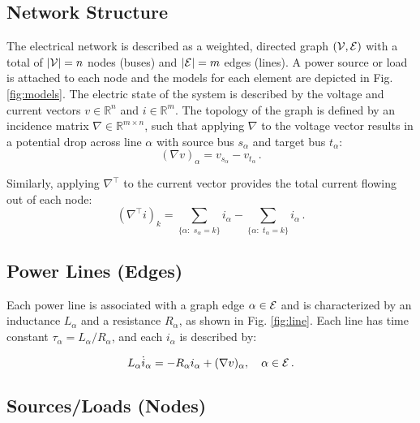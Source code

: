 \documentclass[letterpaper, 10 pt, conference]{ieeeconf}
\begin{document}
\subsection{Network Structure}

The electrical network is described as a weighted, directed graph $({\cal V,\cal E})$ with a total of  $|{\cal V}| = n$ nodes (buses) and $|{\cal E}| = m$ edges (lines). A power source or load is attached to each node and the models for each element are depicted in Fig. \ref{fig:models}. The electric state of the system is described by the voltage and current vectors $v \in \mathbb{R}^n$ and $i \in \mathbb{R}^m$. The topology of the graph is defined by an incidence matrix $\nabla \in \mathbb{R}^{m\times n}$, such that applying $\nabla$ to the voltage vector results in a potential drop across line $\alpha$ with source bus $s_\alpha$ and target bus $t_{\alpha}$:
\begin{equation}\label{Eq:vdrop}
    (\nabla v)_\alpha = v_{s_\alpha} - v_{t_\alpha}\,.
\end{equation}

\noindent Similarly, applying $\nabla^\top$ to the current vector provides the total current flowing out of each node:
\begin{equation}\label{Eq:isum}
 (\nabla^\top i)_k = \sum_{\{\alpha:\,\, s_\alpha = k\}} i_\alpha - \sum_{\{\alpha:\,\, t_\alpha = k\}} i_\alpha\,.
\end{equation}



\subsection{Power Lines (Edges)}

Each power line is associated with a graph edge $\alpha \in {\cal E}$ and is characterized by an inductance $L_\alpha$ and a resistance $R_\alpha$, as shown in Fig. \ref{fig:line}. Each line has time constant $\tau_\alpha = L_\alpha/R_\alpha$, and each $i_{\alpha}$ is described by:

\begin{equation}
    L_\alpha \dot i_\alpha = - R_\alpha i_\alpha + (\nabla v)_\alpha, \quad \alpha \in {\cal E}\,.
\end{equation}

\subsection{Sources/Loads (Nodes)}
\end{document}
